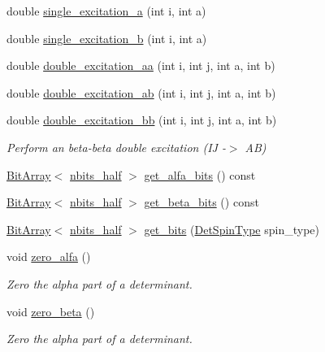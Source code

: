\begin{DoxyCompactItemize}
double \mbox{\hyperlink{classforte_1_1_determinant_impl_a29e9efc18d8346cd7e2809a1e9c8f2a9}{single\+\_\+excitation\+\_\+a}} (int i, int a)
\item 
double \mbox{\hyperlink{classforte_1_1_determinant_impl_ade9281e561132e5ea22cc515b051e14b}{single\+\_\+excitation\+\_\+b}} (int i, int a)
\item 
double \mbox{\hyperlink{classforte_1_1_determinant_impl_a2279b78fd6dc7dfdcd0e0a1c7f77b9ac}{double\+\_\+excitation\+\_\+aa}} (int i, int j, int a, int b)
\item 
double \mbox{\hyperlink{classforte_1_1_determinant_impl_ac5c15433d3496bdd90e867bfe396c948}{double\+\_\+excitation\+\_\+ab}} (int i, int j, int a, int b)
\item 
double \mbox{\hyperlink{classforte_1_1_determinant_impl_a1ddb5fecd7e198cfcc6d5bc61a7ca866}{double\+\_\+excitation\+\_\+bb}} (int i, int j, int a, int b)
\begin{DoxyCompactList}\small\item\em Perform an beta-\/beta double excitation (IJ -\/$>$ AB) \end{DoxyCompactList}\item 
\mbox{\hyperlink{classforte_1_1_bit_array}{Bit\+Array}}$<$ \mbox{\hyperlink{classforte_1_1_determinant_impl_ac8d2a64c2fb785ccb79b1cecc553d63d}{nbits\+\_\+half}} $>$ \mbox{\hyperlink{classforte_1_1_determinant_impl_a29ea8ae7c2f083aaa959d9f6f1de9d3c}{get\+\_\+alfa\+\_\+bits}} () const
\item 
\mbox{\hyperlink{classforte_1_1_bit_array}{Bit\+Array}}$<$ \mbox{\hyperlink{classforte_1_1_determinant_impl_ac8d2a64c2fb785ccb79b1cecc553d63d}{nbits\+\_\+half}} $>$ \mbox{\hyperlink{classforte_1_1_determinant_impl_a9109cbc06b0753d030de49786a4d6b22}{get\+\_\+beta\+\_\+bits}} () const
\item 
\mbox{\hyperlink{classforte_1_1_bit_array}{Bit\+Array}}$<$ \mbox{\hyperlink{classforte_1_1_determinant_impl_ac8d2a64c2fb785ccb79b1cecc553d63d}{nbits\+\_\+half}} $>$ \mbox{\hyperlink{classforte_1_1_determinant_impl_a924606ae7e4855ccb197fc3e5bec7028}{get\+\_\+bits}} (\mbox{\hyperlink{namespaceforte_acb88fa63430aae4a1b15c7be9c55f179}{Det\+Spin\+Type}} spin\+\_\+type)
\item 
void \mbox{\hyperlink{classforte_1_1_determinant_impl_a0c84ab17402db250ba4c64c6991a6723}{zero\+\_\+alfa}} ()
\begin{DoxyCompactList}\small\item\em Zero the alpha part of a determinant. \end{DoxyCompactList}\item 
void \mbox{\hyperlink{classforte_1_1_determinant_impl_aeca8e43710bad20561193304aee10c9b}{zero\+\_\+beta}} ()
\begin{DoxyCompactList}\small\item\em Zero the alpha part of a determinant. \end{DoxyCompactList}\end{DoxyCompactItemize}
